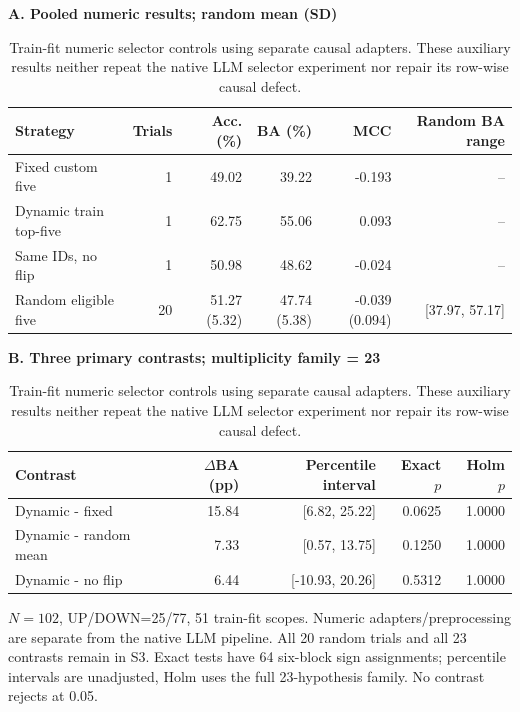 \begin{table}[!htbp]
\centering\small
\setlength{\tabcolsep}{3pt}
\renewcommand{\arraystretch}{1.15}
\caption{Train-fit numeric selector controls using separate causal adapters. These auxiliary results neither repeat the native LLM selector experiment nor repair its row-wise causal defect.}
\label{tab:numeric}
\textbf{A. Pooled numeric results; random mean (SD)}\par\smallskip
\begin{tabular}{lrrrrr}
\hline
Strategy & Trials & Acc. (\%) & BA (\%) & MCC & Random BA range \\
\hline
Fixed custom five & 1 & 49.02 & 39.22 & -0.193 & -- \\
Dynamic train top-five & 1 & 62.75 & 55.06 & 0.093 & -- \\
Same IDs, no flip & 1 & 50.98 & 48.62 & -0.024 & -- \\
Random eligible five & 20 & 51.27 (5.32) & 47.74 (5.38) & -0.039 (0.094) & [37.97, 57.17] \\
\hline
\end{tabular}\par\medskip
\textbf{B. Three primary contrasts; multiplicity family = 23}\par\smallskip
\begin{tabular}{lrrrr}
\hline
Contrast & $\Delta$BA (pp) & Percentile interval & Exact $p$ & Holm $p$ \\
\hline
Dynamic - fixed & 15.84 & [6.82, 25.22] & 0.0625 & 1.0000 \\
Dynamic - random mean & 7.33 & [0.57, 13.75] & 0.1250 & 1.0000 \\
Dynamic - no flip & 6.44 & [-10.93, 20.26] & 0.5312 & 1.0000 \\
\hline
\end{tabular}\par\medskip
\begin{minipage}{\textwidth}\footnotesize $N=102$, UP/DOWN=25/77, 51 train-fit scopes. Numeric adapters/preprocessing are separate from the native LLM pipeline. All 20 random trials and all 23 contrasts remain in S3. Exact tests have 64 six-block sign assignments; percentile intervals are unadjusted, Holm uses the full 23-hypothesis family. No contrast rejects at 0.05.\end{minipage}
\end{table}
